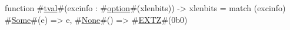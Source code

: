 function #\hyperref[sailRISCVztval]{tval}#(excinfo : #\hyperref[sailRISCVzoption]{option}#(xlenbits)) -> xlenbits = {
  match (excinfo) {
    #\hyperref[sailRISCVzSome]{Some}#(e) => e,
    #\hyperref[sailRISCVzNone]{None}#()  => #\hyperref[sailRISCVzEXTZ]{EXTZ}#(0b0)
  }
}
